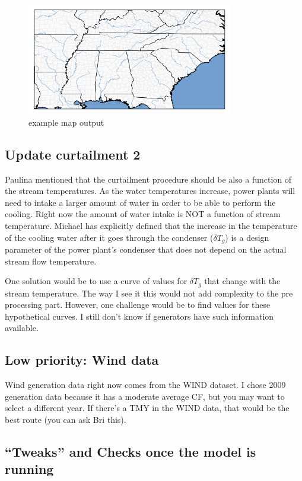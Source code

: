 \documentclass[11pt, oneside]{article}   	%
\begin{document}
\begin{figure}[H]
   \centering
   \includegraphics[width=0.8\textwidth]{../../maps/example} %
   \caption{example map output}
\end{figure}

\subsection{Update curtailment 2}
Paulina mentioned that the curtailment procedure should be also a function of the stream temperatures. As the water temperatures increase, power plants will need to intake a larger amount of water in order to be able to perform the cooling. Right now the amount of water intake is NOT a function of stream temperature. Michael has explicitly defined that the increase in the temperature of the cooling water after it goes through the condenser ($\delta T_g$) is a design parameter of the power plant's condenser that does not depend on the actual stream flow temperature.

One solution would be to use a curve of values for $\delta T_g$ that change with the stream temperature. The way I see it this would not add complexity to the pre processing part. However, one challenge would be to find values for these hypothetical curves. I still don't know if generators have such information available.

\subsection{Low priority: Wind data}

Wind generation data right now comes from the WIND dataset. I chose 2009 generation data because it has a moderate average CF, but you may want to select a different year. If there's a TMY in the WIND data, that would be the best route (you can ask Bri this). 

\subsection{``Tweaks'' and Checks once the model is running}
\end{document}
